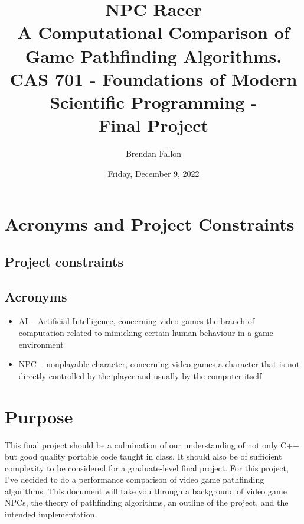\documentclass[letterpaper,12pt]{article}  %
\title{ %
    NPC Racer \\
    \large A Computational Comparison of Game Pathfinding Algorithms. \\
    CAS 701 - Foundations of Modern Scientific Programming - \\
    Final Project}
\date{Friday, December 9, 2022} %
\author{Brendan Fallon}
\begin{document}

\maketitle  %

\tableofcontents  %

\section{Acronyms and Project Constraints}

\subsection{Project constraints}





\subsection{Acronyms}

\begin{itemize}
	\item AI – Artificial Intelligence, concerning video games the branch of 
	computation 
	related to mimicking certain human behaviour in a game environment \cite{ 
		millingtonAIGamesThird2019}
	\item NPC – nonplayable character, concerning video games a character that 
	is not 
	directly controlled by the player and usually by the computer itself \cite{ 
		millingtonAIGamesThird2019}
\end{itemize}



\section{Purpose}
This final project should be a culmination of our understanding of not only C++ 
but good quality portable code taught in class. It should also be of sufficient 
complexity to be considered for a graduate-level final project. For this 
project, I’ve decided to do a performance comparison of video game pathfinding 
algorithms. This document will take you through a background of video game 
NPCs, the theory of pathfinding algorithms, an outline of the project, and the 
intended implementation. 
\end{document}
